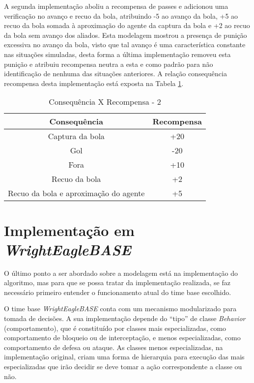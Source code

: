 A segunda implementação aboliu a recompensa de passes e adicionou uma
verificação no avanço e recuo da bola, atribuindo -5 ao avanço da bola, +5 ao
recuo da bola somada à aproximação do agente da captura da bola e +2 ao recuo da
bola sem avanço dos aliados. Esta modelagem mostrou a presença de 
punição excessiva no avanço da bola, visto que tal avanço é uma
característica constante nas situações simuladas, desta forma a última
implementação removeu esta punição e atribuiu recompensa neutra a esta e como
padrão para não identificação de nenhuma das situações anteriores. A relação
consequência recompensa desta implementação está exposta na Tabela
\ref{tab:rewards2}.

\begin{table}[hbt]
    \centering
    \begin{tabular}{c|c}
        Consequência    &   Recompensa  \\ \hline
        Captura da bola &   +20 \\
        Gol             &   -20 \\
        Fora            &   +10 \\
        Recuo da bola   &   +2  \\
        Recuo da bola e
        aproximação do
        agente          &   +5 \\
    \end{tabular}
    \caption{Consequência X Recompensa - 2}
    \label{tab:rewards2}
\end{table}

\section{Implementação em \textit{WrightEagleBASE}}\label{implementacao}

O último ponto a ser abordado sobre a modelagem está na implementação do
algoritmo, mas para que se possa tratar da implementação realizada, se faz
necessário primeiro entender o funcionamento atual do time base escolhido.

O time base \textit{WrightEagleBASE} conta com um mecanismo modularizado para
tomada de decisões. A sua implementação depende do ``tipo'' de classe
\textit{Behavior} (comportamento), que é constituído por classes mais
especializadas, como comportamento de bloqueio ou de interceptação, e menos
especializadas, como comportamento de defesa ou ataque. As classes menos
especializadas, na implementação original, criam uma forma de hierarquia para
execução das mais especializadas que irão decidir se deve tomar a ação
correspondente a classe ou não. 

